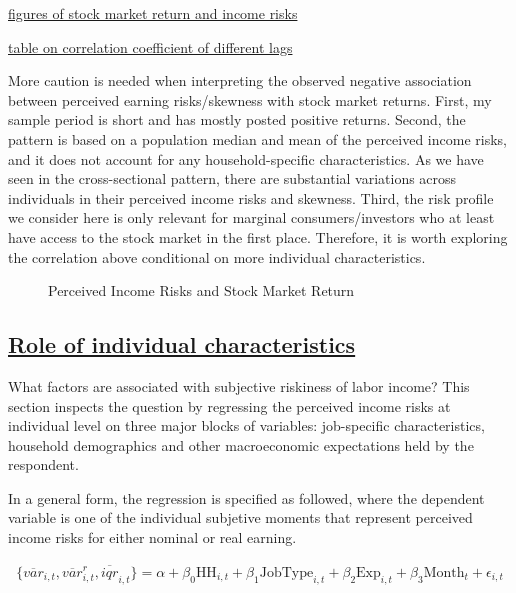 \documentclass[12pt,notitlepage,onecolumn,aps,pra]{revtex4-1}
\begin{document}
\href{../Graphs/pop/ts.jpg}{figures of stock market return and income
risks}

\href{../Tables/latex/macro_corr.tex}{table on correlation coefficient
of different lags}

More caution is needed when interpreting the observed negative
association between perceived earning risks/skewness with stock market
returns. First, my sample period is short and has mostly posted positive
returns. Second, the pattern is based on a population median and mean of
the perceived income risks, and it does not account for any
household-specific characteristics. As we have seen in the
cross-sectional pattern, there are substantial variations across
individuals in their perceived income risks and skewness. Third, the
risk profile we consider here is only relevant for marginal
consumers/investors who at least have access to the stock market in the
first place. Therefore, it is worth exploring the correlation above
conditional on more individual characteristics.


    \begin{figure*}
        \begin{center}\end{center}
        \caption{Perceived Income Risks and Stock Market Return}
        \label{fig:tssp500}
    \end{figure*}
    

    \hypertarget{role-of-individual-characteristics}{%
\subsection{\texorpdfstring{\href{MicroRiskProfile.ipynb}{Role of
individual
characteristics}}{Role of individual characteristics}}\label{role-of-individual-characteristics}}

What factors are associated with subjective riskiness of labor income?
This section inspects the question by regressing the perceived income
risks at individual level on three major blocks of variables:
job-specific characteristics, household demographics and other
macroeconomic expectations held by the respondent.

In a general form, the regression is specified as followed, where the
dependent variable is one of the individual subjetive moments that
represent perceived income risks for either nominal or real earning.

\begin{eqnarray}
\{\overline{var}_{i,t}, \overline{var}^r_{i,t}, \overline{iqr}_{i,t}\} = \alpha + \beta_0 \textrm{HH}_{i,t} + \beta_1 \textrm{JobType}_{i,t} + \beta_2 \textrm{Exp}_{i,t} + \beta_3 \textrm{Month}_t + \epsilon_{i,t}
\end{eqnarray}
\end{document}

